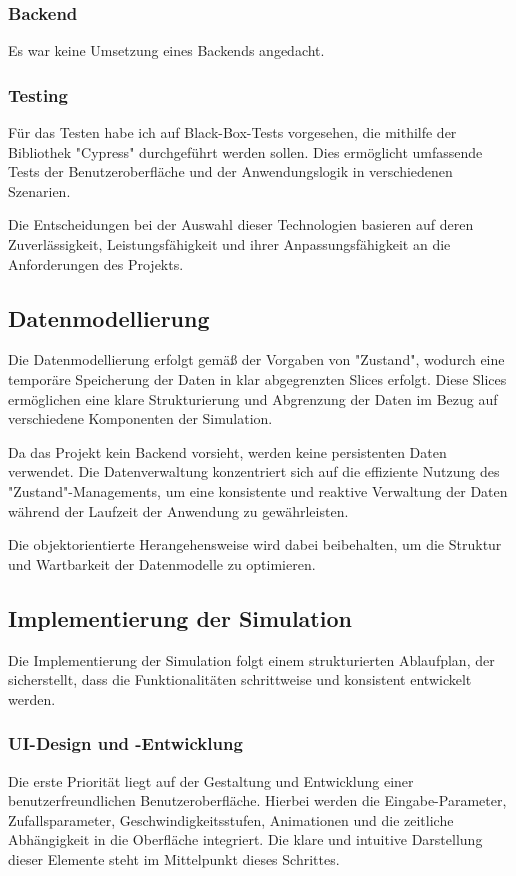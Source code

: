 \documentclass{article}
\begin{document}
\subsubsection{Backend}
Es war keine Umsetzung eines Backends angedacht.

\subsubsection{Testing}
Für das Testen habe ich auf Black-Box-Tests vorgesehen, die mithilfe der Bibliothek "Cypress" durchgeführt werden sollen. Dies ermöglicht umfassende Tests der Benutzeroberfläche und der Anwendungslogik in verschiedenen Szenarien.

Die Entscheidungen bei der Auswahl dieser Technologien basieren auf deren Zuverlässigkeit, Leistungsfähigkeit und ihrer Anpassungsfähigkeit an die Anforderungen des Projekts.

\subsection{Datenmodellierung}
Die Datenmodellierung erfolgt gemäß der Vorgaben von "Zustand", wodurch eine temporäre Speicherung der Daten in klar abgegrenzten Slices erfolgt. Diese Slices ermöglichen eine klare Strukturierung und Abgrenzung der Daten im Bezug auf verschiedene Komponenten der Simulation.

Da das Projekt kein Backend vorsieht, werden keine persistenten Daten verwendet. Die Datenverwaltung konzentriert sich auf die effiziente Nutzung des "Zustand"-Managements, um eine konsistente und reaktive Verwaltung der Daten während der Laufzeit der Anwendung zu gewährleisten.

Die objektorientierte Herangehensweise wird dabei beibehalten, um die Struktur und Wartbarkeit der Datenmodelle zu optimieren.

\subsection{Implementierung der Simulation}
Die Implementierung der Simulation folgt einem strukturierten Ablaufplan, der sicherstellt, dass die Funktionalitäten schrittweise und konsistent entwickelt werden.

\subsubsection{UI-Design und -Entwicklung}
Die erste Priorität liegt auf der Gestaltung und Entwicklung einer benutzerfreundlichen Benutzeroberfläche. Hierbei werden die Eingabe-Parameter, Zufallsparameter, Geschwindigkeitsstufen, Animationen und die zeitliche Abhängigkeit in die Oberfläche integriert. Die klare und intuitive Darstellung dieser Elemente steht im Mittelpunkt dieses Schrittes.
\end{document}
